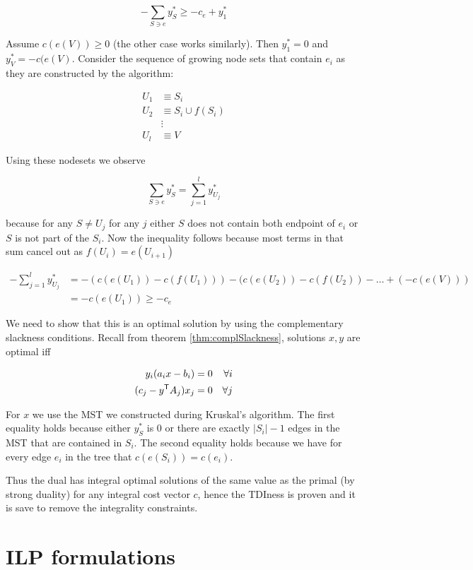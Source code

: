 \[-\sum_{S\ni e} y_S^* \geq -c_e + y_1^*\]

Assume $c(e(V))\geq 0$ (the other case works similarly). Then $y_1^*=0$ and $y_V^*=-c(e(V)$. Consider the sequence of growing node sets that contain $e_i$ as they are constructed by the algorithm:

\begin{align*}
U_1 &\equiv S_i\\
U_2 &\equiv S_i \cup f(S_i)\\
&\vdots\\
U_l &\equiv V
\end{align*}

Using these nodesets we observe

\[\sum_{S\ni e} y_S^* = \sum_{j=1}^l y_{U_j}^*\]

because for any $S\neq U_j$ for any $j$ either $S$ does not contain both endpoint of $e_i$ or $S$ is not part of the $S_i$. Now the inequality follows because most terms in that sum cancel out as $f(U_i)=e(U_{i+1})$

\begin{align*}
-\sum_{j=1}^l y_{U_j}^* &= -(c(e(U_1)) - c(f(U_1))) - (c(e(U_2)) - c(f(U_2)) - \ldots + (-c(e(V)))\\
	&=-c(e(U_1)) \geq -c_e
\end{align*}

We need to show that this is an optimal solution by using the complementary slackness conditions. Recall from theorem \ref{thm:complSlackness}, solutions $x,y$ are optimal iff

\begin{align*}
y_i(a_ix-b_i) = 0 && \forall i\\ 
(c_j - {y}^\text{\upshape \sffamily T}A_j)x_j =0 && \forall j
\end{align*}

For $x$ we use the MST we constructed during Kruskal's algorithm. The first equality holds because either $y_S^*$ is 0 or there are exactly $|S_i|-1$ edges in the MST that are contained in $S_i$. The second equality holds because we have for every edge $e_i$ in the tree that $c(e(S_i))=c(e_i)$.

Thus the dual has integral optimal solutions of the same value as the primal (by strong duality) for any integral cost vector $c$, hence the TDIness is proven and it is save to remove the integrality constraints.


\section{ILP formulations}

